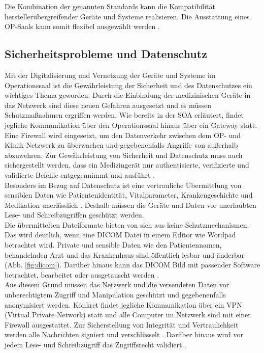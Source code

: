Die Kombination der genannten Standards kann die Kompatibilität herstellerübergreifender Geräte und Systeme realisieren. 
Die Ausstattung eines OP-Saals kann somit flexibel ausgewählt werden \cite{DerDigitaleOperationssaal}.

\subsection{Sicherheitsprobleme und Datenschutz}

Mit der Digitalisierung und Vernetzung der Geräte und Systeme im Operationssaal ist die Gewährleistung der Sicherheit und des Datenschutzes ein wichtiges Thema geworden.
Durch die Einbindung der medizinischen Geräte in das Netzwerk sind diese neuen Gefahren ausgesetzt und es müssen Schutzmaßnahmen ergriffen werden. Wie bereits in der SOA erläutert, findet jegliche Kommunikation über den Operationssaal hinaus über ein Gateway statt. Eine Firewall wird eingesetzt, um den Datenverkehr zwischen dem OP- und Klinik-Netzwerk zu überwachen und gegebenenfalls Angriffe von außerhalb abzuwehren. Zur Gewährleistung von Sicherheit und Datenschutz muss auch sichergestellt werden, dass \glqq ein Medizingerät nur authentisierte, verifizierte und validierte Befehle entgegennimmt und ausführt\grqq{} \cite{DerDigitaleOperationssaal}. \\
Besonders im Bezug auf Datenschutz ist eine \glqq vertrauliche Übermittlung von sensiblen Daten wie Patientenidentität, Vitalparameter, Krankengeschichte und Medikation unerlässlich\grqq{} \cite{DerDigitaleOperationssaal}. Deshalb müssen die Geräte und Daten vor unerlaubten Lese- und Schreibzugriffen geschützt werden. \\
Die übermittelten Dateiformate bieten von sich aus keine Schutzmechanismen. Das wird deutlich, wenn eine DICOM Datei in einem Editor wie Wordpad betrachtet wird. Private und sensible Daten wie den Patientennamen, behandelnden Arzt und das Krankenhaus sind öffentlich lesbar und änderbar (Abb. \ref{fig:dicom}). Darüber hinaus kann das DICOM Bild mit passender Software betrachtet, bearbeitet oder ausgetauscht werden \cite{DICOM}.\\
Aus diesem Grund müssen das Netzwerk und die versendeten Daten vor unberechtigtem Zugriff und Manipulation geschützt und gegebenenfalls anonymisiert werden. Konkret findet jegliche Kommunikation über ein VPN (Virtual Private Network) statt und alle Computer im Netzwerk sind mit einer Firewall ausgestattet. Zur Sicherstellung von Integrität und Vertraulichkeit werden alle Nachrichten signiert und verschlüsselt \cite{DerDigitaleOperationssaal}. Darüber hinaus wird vor jedem Lese- und Schreibzugriff das Zugriffsrecht validiert \cite{DICOM}.

